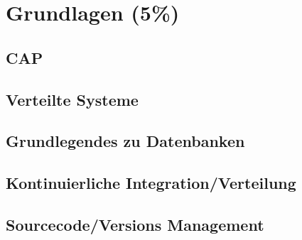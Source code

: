 \chapter{Grundlagen (5\%)}
\section{CAP}
\section{Verteilte Systeme}
\section{Grundlegendes zu Datenbanken}
\section{Kontinuierliche Integration/Verteilung}
\section{Sourcecode/Versions Management}

